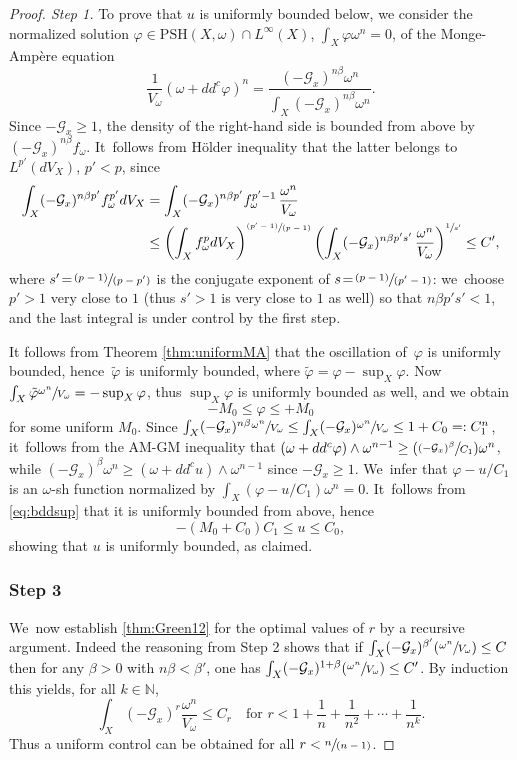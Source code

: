 \documentclass[10pt]{amsart}
\newcommand{\Psfrac}[2]{(\sfrac{#1}{#2})}
\newcommand{\spfrac}[2]{\sfrac{#1}{(#2)}}
\newcommand{\pspfrac}[2]{\sfrac{(#1)}{(#2)}}
\theoremstyle{definition}
\newcommand{\N}{\mathbb N}
\let\f\varphi
\newcommand \PSH {\mathrm{PSH}}
\begin{document}
\begin{proof}[Proof. Step 1]
To prove that $u$ is uniformly bounded below, we
consider the normalized solution $\f \in\PSH(X,\omega) \cap L^{\infty}(X)$, $\int_X \f \omega^n=0$,
of the Monge-Ampère equation
\[
\frac{1}{V_{\omega}} (\omega+dd^c \f)^n = \frac{(-{\mathcal G}_x)^{n\beta} \omega^n}{\int_X (-{\mathcal G}_x)^{n\beta} \omega^n}.
\]
Since $-{\mathcal G}_x \geq 1$, the density of the right-hand side is bounded from above by $(-{\mathcal G}_x)^{n\beta} f_{\omega}$. It~follows from Hölder inequality that the latter belongs to $L^{p'}(dV_X)$, $p'<p$, since
\begin{align*}
\int_X (-{\mathcal G}_x)^{n\beta p'} f_{\omega}^{p'} dV_X
&= \int_X (-{\mathcal G}_x)^{n\beta p'} f_{\omega}^{p'-1}\, \frac{\omega^n}{V_{\omega}} \\
&\leq  \left( \int_X f_{\omega}^p dV_X \right)^{\pspfrac{p'-1}{p-1}}
\left( \int_X (-{\mathcal G}_x)^{n\beta p's'}\, \frac{\omega^n}{V_{\omega}} \right)^{\sfrac{1}{s'}}
\leq C',
\end{align*}
where $s'\!=\!\pspfrac{p-1}{p-p'}$ is the conjugate exponent of $s\!=\!\pspfrac{p-1}{p'-1}$:
we~choose $p'>1$ very close to $1$ (thus $s'>1$ is very close to $1$ as well) so that
$n\beta p' s'<1$, and the last integral is under control by the first step.

It follows from Theorem \ref{thm:uniformMA} that the oscillation of~$\f$ is uniformly bounded,
hence~$\tilde{\f}$ is uniformly bounded, where $\tilde{\f}=\f-\sup_X \f$.
Now $\int_X \tilde{\f} \sfrac{\omega^n}{V_{\omega}}=-\sup_X \f$, thus $\sup_X \f$ is uniformly bounded as well,
and we obtain
\[
-M_0 \leq \f \leq +M_0
\]
for some uniform $M_0$.
Since $\int_X (-{\mathcal G}_x)^{n\beta} \sfrac{\omega^n}{V_{\omega}}
\leq \int_X (-{\mathcal G}_x) \sfrac{\omega^n}{V_{\omega}} \leq 1+C_0=:C_1^n$, it~follows from the AM-GM inequality that $(\omega+dd^c \f) \wedge \omega^{n-1} \geq \Psfrac{(-{\mathcal G}_x)^{\beta}}{C_1} \omega^n$,
while $ (-{\mathcal G}_x)^{\beta} \omega^n \geq (\omega+dd^c u) \wedge \omega^{n-1}$ since $-{\mathcal G}_x \geq 1$. We~infer that $\f-u/C_1$ is an $\omega$-sh function
normalized by $\int_X (\f-u/C_1) \omega^n=0$. It~follows from \eqref{eq:bddsup} that
it is uniformly bounded from above, hence
\[
-(M_0+C_0)C_1 \leq u \leq C_0,
\]
showing that $u$ is uniformly bounded, as claimed.

\subsubsection*{Step 3}
We~now establish \eqref{thm:Green12} for the optimal values of $r$ by a recursive argument.
Indeed the reasoning from Step 2 shows that if $\int_X (-{\mathcal G}_x)^{\beta'} \Psfrac{\omega^n}{V_{\omega}} \leq C$
then for any $\beta>0$ with $n\beta < \beta'$, one has $\int_X (-{\mathcal G}_x)^{1+\beta} \Psfrac{\omega^n}{V_{\omega}} \leq C'$.
By induction this yields, for all $k \in \N$,
\[
\int_X (-{\mathcal G}_x)^{r} \frac{\omega^n}{V_{\omega}} \leq C_r
\quad \text{for }
r<1+\frac{1}{n}+\frac{1}{n^2}+\cdots+\frac{1}{n^k}.
\]
Thus a uniform control can be obtained for all $r<\spfrac{n}{n-1}$.


\end{proof}
\end{document}
